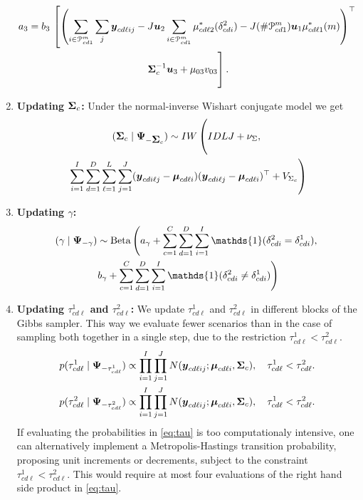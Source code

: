 \begin{enumerate}
\begin{multline*}
  a_3 = b_3\, \left[\left( \sum_{i \in \mathcal{P}^m_{cd1}} \sum_j \bfy_{cd\ell ij} - J\bfu_2 \sum_{i \in \mathcal{P}^m_{cd1}}\mu^*_{cd\ell 2}(\delta^2_{cdi}) - J(\#\mathcal{P}^m_{cd1})\bfu_1 \mu^*_{cd\ell 1}(m) \right)^{\top} \right.\\
\left. \vphantom{\sum_{i \in \mathcal{P}^m_{cd2}} \sum_j}    \bfSigma^{-1}_c\bfu_3 + \mu_{03}v_{03}\right].
\end{multline*}
%
\item {\bf Updating $\mbox{\boldmath $\Sigma$}_c$: }
Under the normal-inverse Wishart conjugate model we get
\begin{multline*}
(\bfSigma_c \mid \bfPsi_{-\bfSigma_c}) \sim IW\left( IDLJ + \nu_{\Sigma}, \vphantom{\sum^J_{j=1}}\right. \\
\left. \sum^I_{i=1} \sum^D_{d=1} \sum^L_{\ell=1}
\sum^J_{j=1}(\bfy_{cdi\ell j} - \bfmu_{cd\ell i} )(\bfy_{cdi\ell j} -
\bfmu_{cd\ell i} )^{\top} + V_{\Sigma_c} \right)
\end{multline*}
%
\item {\bf Updating $\gamma$: }
\begin{multline*}
  (\gamma \mid \bfPsi_{-\gamma}) \sim \mbox{Beta}\left( a_{\gamma} + \sum^C_{c=1}
  \sum^D_{d=1} \sum^I_{i=1} \mathds{1}(\delta^2_{cdi} = \delta^1_{cdi}),
 \right. \\ 
  \left. b_{\gamma} + 
  \sum^C_{c=1} \sum^D_{d=1} \sum^I_{i=1} \mathds{1}(\delta^2_{cdi} \neq
  \delta^1_{cdi} ) \right)
\end{multline*}
%
\item {\bf Updating $\tau^1_{cd\ell}$ and $\tau^2_{cd\ell}$: }
We update $\tau^1_{cd\ell}$ and $\tau^2_{cd\ell}$ in different blocks of
the Gibbs sampler. This way we evaluate fewer scenarios than in the
case of sampling both together in a single step, due to the
restriction $\tau^1_{cd\ell}<\tau^2_{cd\ell}$.
\begin{gather}
 p(\tau^1_{cd\ell} \mid \mbox{\boldmath $\Psi$}_{-\tau^1_{cd\ell}} ) \propto \prod^I_{i=1}
 \prod^J_{j=1} N(\mbox{\boldmath $y$}_{cd\ell ij}; \mbox{\boldmath $\mu$}_{cd\ell i}, \mbox{\boldmath $\Sigma$}_c), \ \ \
 \tau^1_{cd\ell}<\tau^2_{cd\ell}. \nonumber \\
 p(\tau^2_{cd\ell} \mid \mbox{\boldmath $\Psi$}_{-\tau^2_{cd\ell}} ) \propto \prod^I_{i=1}
 \prod^J_{j=1} N(\mbox{\boldmath $y$}_{cd\ell ij}; \mbox{\boldmath $\mu$}_{cd\ell i}, \mbox{\boldmath $\Sigma$}_c), \ \ \
 \tau^1_{cd\ell}<\tau^2_{cd\ell}.
 \label{eq:tau}
\end{gather}
If evaluating the probabilities in \eqref{eq:tau} is too
computationaly intensive, one can alternatively implement
a Metropolis-Hastings transition probability, proposing 
unit increments or decrements, subject to the constraint
$\tau^1_{cd\ell}<\tau^2_{cd\ell}$. This would require at most
four evaluations of the right hand side product in \eqref{eq:tau}.  \ech


\end{enumerate}
